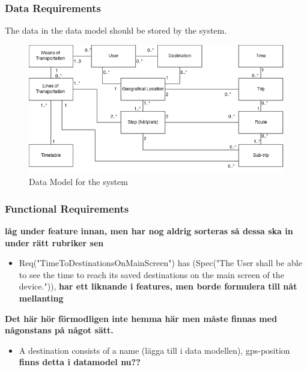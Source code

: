 \documentclass[a4paper]{article}
\begin{document}
			\subsubsection{Data Requirements}
				The data in the data model should be stored by the system.	
				\begin{figure}[h]
					\includegraphics[scale=0.50]{datamodel-v2.png}
					\caption{Data Model for the system}
				\end{figure}
				
				
				
			\subsubsection{Functional Requirements}
				
		
				\textbf{låg under feature innan, men har nog aldrig sorteras så dessa ska in under rätt rubriker sen}
			
				\begin{itemize}
					


					\item Req("TimeToDestinationsOnMainScreen") has (Spec("The User shall be able to see the time to reach its saved destinations on the main screen of the device.")), \textbf{har ett liknande i features, men borde formulera till nåt mellanting}
				\end{itemize}	
					
					
				\textbf{Det här hör förmodligen inte hemma här men måste finnas med någonstans på något sätt.}
				\begin{itemize}
					
					\item A destination consists of a name (lägga till i data modellen), gps-position \textbf{finns detta i datamodel nu??}
				\end{itemize}
\end{document}
